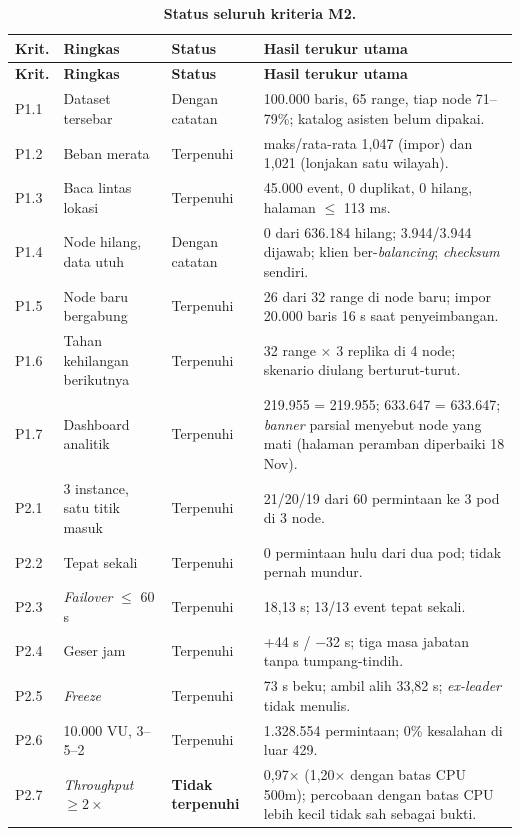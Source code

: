 \documentclass{fairmeta}
\newcommand{\code}[1]{\texttt{\detokenize{#1}}}
\newcommand{\en}[1]{\textit{#1}}
\begin{document}
\small
\setlength{\tabcolsep}{3pt}
\begin{longtable}{@{}L{0.9cm}L{4.6cm}L{2.3cm}L{7.6cm}@{}}
\caption{\textbf{Status seluruh kriteria M2.}}\label{tab:synthesis}\\
\toprule
\textbf{Krit.} & \textbf{Ringkas} & \textbf{Status} & \textbf{Hasil terukur utama}\\
\midrule
\endfirsthead
\toprule
\textbf{Krit.} & \textbf{Ringkas} & \textbf{Status} & \textbf{Hasil terukur utama}\\
\midrule
\endhead
\bottomrule
\endfoot
P1.1 & Dataset tersebar & Dengan catatan & 100.000 baris, 65 range, tiap node 71--79\%; katalog asisten belum dipakai.\\
P1.2 & Beban merata & Terpenuhi & maks/rata-rata 1,047 (impor) dan 1,021 (lonjakan satu wilayah).\\
P1.3 & Baca lintas lokasi & Terpenuhi & 45.000 event, 0 duplikat, 0 hilang, halaman $\leq$ 113 ms.\\
P1.4 & Node hilang, data utuh & Dengan catatan & 0 dari 636.184 hilang; 3.944/3.944 dijawab; klien ber-\en{balancing}; \en{checksum} sendiri.\\
P1.5 & Node baru bergabung & Terpenuhi & 26 dari 32 range di node baru; impor 20.000 baris 16 s saat penyeimbangan.\\
P1.6 & Tahan kehilangan berikutnya & Terpenuhi & 32 range $\times$ 3 replika di 4 node; skenario diulang berturut-turut.\\
P1.7 & Dashboard analitik & Terpenuhi & 219.955 = 219.955; 633.647 = 633.647; \en{banner} parsial menyebut node yang mati (halaman peramban diperbaiki 18 Nov).\\
\addlinespace[2pt]
P2.1 & 3 instance, satu titik masuk & Terpenuhi & 21/20/19 dari 60 permintaan ke 3 pod di 3 node.\\
P2.2 & Tepat sekali & Terpenuhi & 0 permintaan hulu dari dua pod; \code{fence} tidak pernah mundur.\\
P2.3 & \en{Failover} $\leq$ 60 s & Terpenuhi & 18,13 s; 13/13 event tepat sekali.\\
P2.4 & Geser jam & Terpenuhi & +44 s / $-$32 s; tiga masa jabatan tanpa tumpang-tindih.\\
P2.5 & \en{Freeze} & Terpenuhi & 73 s beku; ambil alih 33,82 s; \en{ex-leader} tidak menulis.\\
P2.6 & 10.000 VU, 3--5--2 & Terpenuhi & 1.328.554 permintaan; 0\% kesalahan di luar 429.\\
P2.7 & \en{Throughput} $\geq 2\times$ & \textbf{Tidak terpenuhi} & 0,97$\times$ (1,20$\times$ dengan batas CPU 500m); percobaan dengan batas CPU lebih kecil tidak sah sebagai bukti.\\

\end{longtable}
\end{document}
